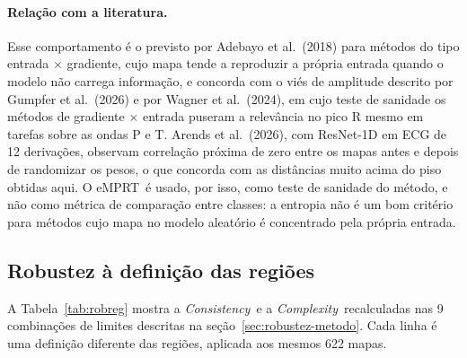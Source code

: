 \documentclass[11pt,a4paper]{article}
\newcommand{\CX}{\textit{Complexity}}
\newcommand{\CS}{\textit{Consistency}}
\newcommand{\EM}{eMPRT}
\begin{document}
\paragraph{Relação com a literatura.} Esse comportamento é o previsto por Adebayo et al.\ (2018) para métodos do tipo entrada × gradiente, cujo mapa tende a reproduzir a própria entrada quando o modelo não carrega informação, e concorda com o viés de amplitude descrito por Gumpfer et al.\ (2026) e por Wagner et al.\ (2024), em cujo teste de sanidade os métodos de gradiente × entrada puseram a relevância no pico R mesmo em tarefas sobre as ondas P e T. Arends et al.\ (2026), com ResNet-1D em ECG de 12 derivações, observam correlação próxima de zero entre os mapas antes e depois de randomizar os pesos, o que concorda com as distâncias muito acima do piso obtidas aqui. O \EM\ é usado, por isso, como teste de sanidade do método, e não como métrica de comparação entre classes: a entropia não é um bom critério para métodos cujo mapa no modelo aleatório é concentrado pela própria entrada.

\subsection{Robustez à definição das regiões}\label{sec:res-robustez}
A Tabela~\ref{tab:robreg} mostra a \CS\ e a \CX\ recalculadas nas 9 combinações de limites descritas na seção~\ref{sec:robustez-metodo}. Cada linha é uma definição diferente das regiões, aplicada aos mesmos 622 mapas.
\end{document}

